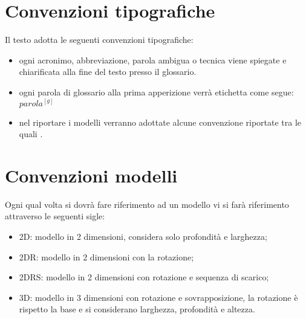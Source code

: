 \section{Convenzioni tipografiche}
Il testo adotta le seguenti convenzioni tipografiche:
\begin{itemize}
    \item ogni acronimo, abbreviazione, parola ambigua o tecnica viene spiegate e chiarificata alla fine del testo presso il glossario.
    \item ogni parola di glossario alla prima apperizione verrà etichetta come segue: $parola^{[g]}$
    \item nel riportare i modelli verranno adottate alcune convenzione riportate tra le quali   .
\end{itemize}
\section{Convenzioni modelli}
Ogni qual volta si dovrà fare riferimento ad un modello vi si farà riferimento attraverso le seguenti sigle:
\begin{itemize}
    \item 2D: modello in 2 dimensioni, considera solo profondità e larghezza;
    \item 2DR: modello in 2 dimensioni con la rotazione;
    \item 2DRS: modello in 2 dimensioni con rotazione e sequenza di scarico;
    \item 3D: modello in 3 dimensioni con rotazione e sovrapposizione, la rotazione è rispetto la base e si considerano larghezza, profondità e altezza.
\end{itemize}